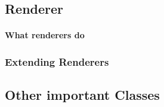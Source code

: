\subsection{Renderer}
\paragraph{}
\paragraph{What renderers do}


\subsubsection{Extending Renderers}
\paragraph{}



\subsection{Other important Classes}
\paragraph{}

